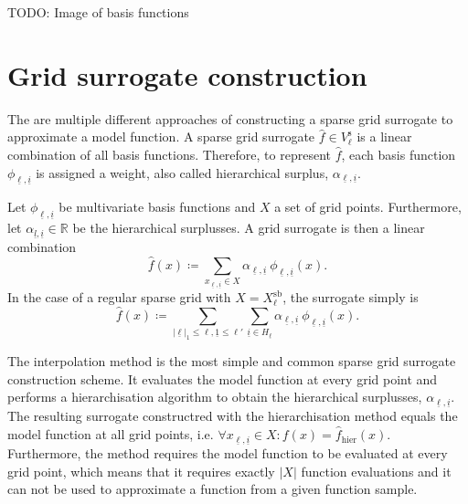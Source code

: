 \documentclass[
  a4paper,  %
  twoside,  %
  bibliography=totoc,
  headsepline,
  cleardoublepage=empty,
  parskip=half,
  draft=false
]{scrbook}
\begin{document}
TODO: Image of basis functions

\section{Grid surrogate construction}
\label{sec:gsc}

The are multiple different approaches of constructing a sparse grid surrogate to approximate a model function.
A sparse grid surrogate $\hat{f} \in V^{\text{s}}_{\ell}$ is a linear combination of all basis functions.
Therefore, to represent $\hat{f}$, each basis function $\phi_{\underline{\ell},\underline{i}}$ is assigned a weight, also called hierarchical surplus, $\alpha_{\underline{\ell},\underline{i}}$.
\begin{definition}
Let $\phi_{\underline{\ell},\underline{i}}$ be multivariate basis functions and $X$ a set of grid points.
Furthermore, let $\alpha_{\underline{l},\underline{i}} \in \mathds{R}$ be the hierarchical surplusses.
A grid surrogate is then a linear combination
\begin{equation}
\hat{f}(x) \coloneqq \sum_{x_{\underline{\ell},\underline{i}} \in X} \alpha_{\underline{\ell},\underline{i}} ~ \phi_{
\underline{\ell},\underline{i}}(x).
\end{equation}
In the case of a regular sparse grid with $X=X^{\text{sb}}_{\ell}$, the surrogate simply is
\begin{equation}
\hat{f}(x) \coloneqq \sum_{|\underline{\ell}|_1 \leq \ell, \underline{1} \leq \ell'} \sum_{\underline{i} \in {H_{\underline{\ell}}}} \alpha_{\underline{\ell},\underline{i}} ~ \phi_{
\underline{\ell},\underline{i}}(x).
\end{equation}
\end{definition}

The interpolation method is the most simple and common sparse grid surrogate construction scheme.
It evaluates the model function at every grid point and performs a hierarchisation algorithm \cite{} to obtain the hierarchical surplusses, $\alpha_{\underline{\ell},\underline{i}}$.
The resulting surrogate constructred with the hierarchisation method equals the model function at all grid points, i.e. $\forall x_{\underline{\ell},\underline{i}} \in X \colon f(x)=\hat{f}_{\text{hier}}(x)$.
Furthermore, the method requires the model function to be evaluated at every grid point, which means that it requires exactly $|X|$ function evaluations and it can not be used to approximate a function from a given function sample.
\end{document}
